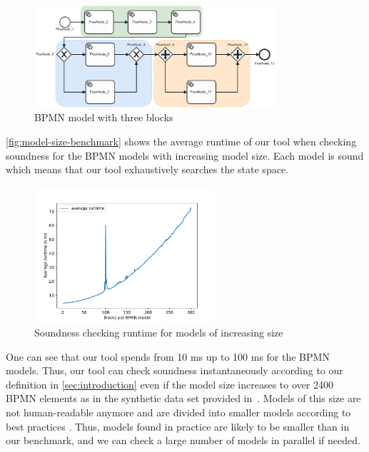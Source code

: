 \documentclass[runningheads]{llncs}
\begin{document}
\begin{figure}[ht]
	\centering
	\includegraphics[width=0.8\textwidth]{images/three-blocks}
	\caption{BPMN model with three blocks~\cite{krauterHigherorderTransformationApproach2023}}
	\label{fig:three-block-example}
\end{figure}

\autoref{fig:model-size-benchmark} shows the average runtime of our tool when checking soundness for the BPMN models with increasing model size.
Each model is sound which means that our tool exhaustively searches the state space.

\begin{figure}[ht]
	\centering
	\includegraphics[width=0.6\textwidth]{images/model-size-benchmark}
	\caption{Soundness checking runtime for models of increasing size}
	\label{fig:model-size-benchmark}
\end{figure}

One can see that our tool spends from 10 ms up to 100 ms for the BPMN models.
Thus, our tool can check soundness instantaneously according to our definition in \autoref{sec:introduction} even if the model size increases to over 2400 BPMN elements as in the synthetic data set provided in~\cite{krauterHigherorderTransformationApproach2023}.
Models of this size are not human-readable anymore and are divided into smaller models according to best practices \cite{fahlandAnalysisDemandInstantaneous2011}.
Thus, models found in practice are likely to be smaller than in our benchmark, and we can check a large number of models in parallel if needed.
\end{document}
